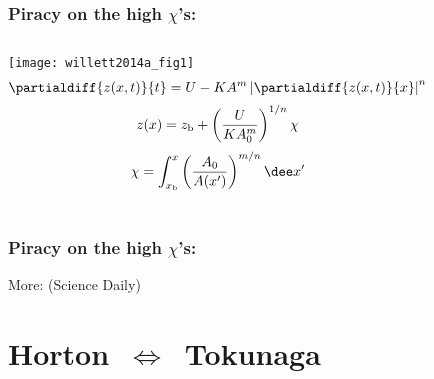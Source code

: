 \begin{frame}[plain]
  \frametitle{Piracy on the high $\chi$'s:}
  
  \begin{block}{}
  \end{block}

  \begin{columns}
    \texttt{[image: willett2014a\_fig1]}
    \small
    $$
    \partialdiff{z(x,t)}{t}
    =
    U
    -
    KA^{m}
    \left|
      \partialdiff{z(x,t)}{x}
    \right|^{n}
    $$
    $$
    z(x)
    =
    z_{\textnormal{b}}
    +
    \left(
      \frac{U}
      {K A_{0}^{m}}
    \right)^{1/n}
    \chi
    $$
    $$
    \chi
    =
    \int_{x_{\textnormal{b}}}^{x}
    \left(
      \frac{A_{0}}
      {A(x')}
    \right)^{m/n}
    \dee x'
    $$
  \end{columns}

\end{frame}

\begin{frame}
  \frametitle{Piracy on the high $\chi$'s:}


  \bigskip

  More:  (Science Daily)
  
\end{frame}

\section{Horton\ \texorpdfstring{$\Leftrightarrow$}{is\ equivalent\ to}\ Tokunaga}

